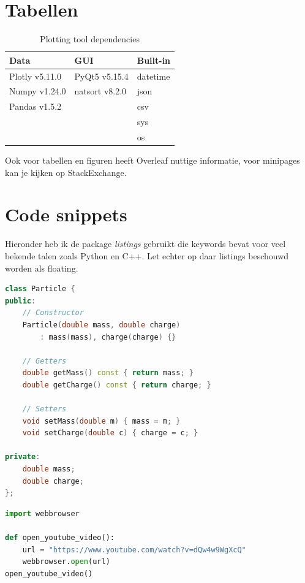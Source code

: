 \documentclass{article}
\begin{document}
\section{Tabellen}
\begin{table}[H]
\centering
\caption{Plotting tool dependencies}
\label{tab:dependencies}
\begin{tabular}{l|l|l}
\rowcolor[HTML]{EFEFEF} 
Data & GUI & Built-in \\ \hline\hline
Plotly v5.11.0 & PyQt5 v5.15.4 & datetime \\ 
Numpy v1.24.0 & natsort v8.2.0 & json \\ 
Pandas v1.5.2 &  & csv \\ 
 &  & sys \\ 
 &  & os \\ 
\end{tabular}
\end{table}

Ook voor tabellen en figuren heeft Overleaf nuttige informatie\cite{OverleafFigures}, voor minipages kan je kijken op StackExchange\cite{StackExchangeMinipage}.

\section{Code snippets}
Hieronder heb ik de package \textit{listings} gebruikt die keywords bevat voor veel bekende talen zoals Python en C++.
Let echter op daar listings beschouwd worden als floating.

\begin{lstlisting}[language=C++]
class Particle {
public:
    // Constructor
    Particle(double mass, double charge) 
        : mass(mass), charge(charge) {}

    // Getters
    double getMass() const { return mass; }
    double getCharge() const { return charge; }

    // Setters
    void setMass(double m) { mass = m; }
    void setCharge(double c) { charge = c; }

private:
    double mass;
    double charge;
};
\end{lstlisting}
\begin{lstlisting}[language=Python,label=listing:python,caption=Python example with caption and label]    
import webbrowser

def open_youtube_video():
    url = "https://www.youtube.com/watch?v=dQw4w9WgXcQ"
    webbrowser.open(url)
open_youtube_video()
\end{lstlisting}
\end{document}
